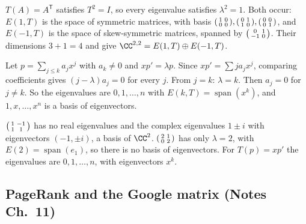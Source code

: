 \documentclass[10pt]{scrartcl}
\DeclareMathOperator{\spn}{span}\DeclareMathOperator{\nul}{null}\DeclareMathOperator{\range}{range}
\newcommand{\PP}{\mathcal P}\newcommand{\LL}{\mathcal L}\newcommand{\MM}{\mathcal M}\newcommand{\T}{\mathsf T}
\begin{document}
\begin{example*}
  $T(A)=A^{\T}$ satisfies $T^2=I$, so every eigenvalue satisfies $\lambda^2=1$. Both occur: $E(1,T)$ is the space of symmetric matrices, with basis $\begin{psmallmatrix}1&0\\0&0\end{psmallmatrix},\begin{psmallmatrix}0&1\\1&0\end{psmallmatrix},\begin{psmallmatrix}0&0\\0&1\end{psmallmatrix}$, and $E(-1,T)$ is the space of skew-symmetric matrices, spanned by $\begin{psmallmatrix}0&1\\-1&0\end{psmallmatrix}$. Their dimensions $3+1=4$ and  give $\CC^{2,2}=E(1,T)\oplus E(-1,T)$.
\end{example*}

\begin{example*}[Eigenvalues of $T(p)=xp'$ on $\PP_n(\RR)$, by leading terms]
  Let $p=\sum_{j\le k}a_jx^j$ with $a_k\ne0$ and $xp'=\lambda p$. Since $xp'=\sum ja_jx^j$, comparing coefficients gives $(j-\lambda)a_j=0$ for every $j$. From $j=k$: $\lambda=k$. Then $a_j=0$ for $j\ne k$. So the eigenvalues are $0,1,\dots,n$ with $E(k,T)=\spn(x^k)$, and $1,x,\dots,x^n$ is a basis of eigenvectors.
\end{example*}

\revisit $\begin{psmallmatrix}1&-1\\1&1\end{psmallmatrix}$ has no real eigenvalues and the complex eigenvalues $1\pm i$ with eigenvectors $(-1,\pm i)$, a basis of $\CC^2$. $\begin{psmallmatrix}2&1\\0&2\end{psmallmatrix}$ has only $\lambda=2$, with $E(2)=\spn(e_1)$, so there is no basis of eigenvectors. For $T(p)=xp'$ the eigenvalues are $0,1,\dots,n$, with eigenvectors $x^k$.

\subsection{PageRank and the Google matrix (Notes Ch.~11)}
\end{document}
